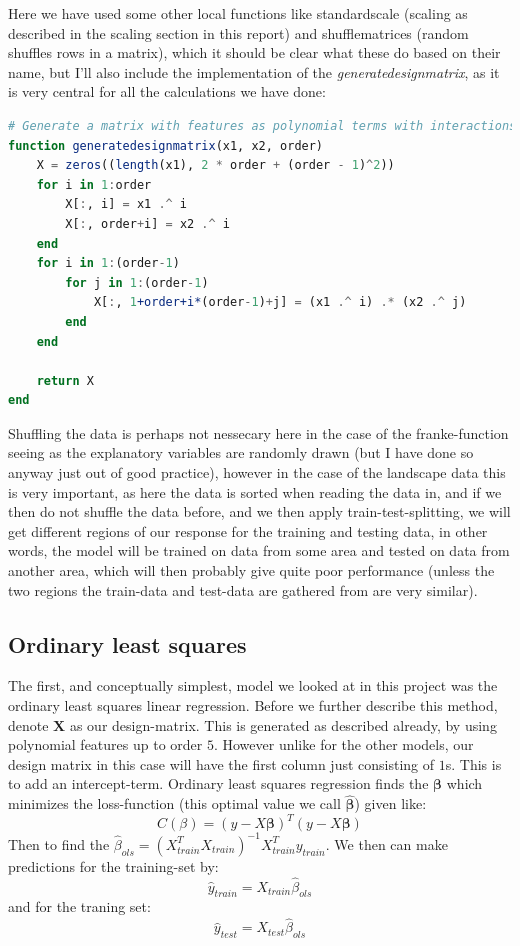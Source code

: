 \documentclass{article}
\begin{document}
Here we have used some other local functions like standardscale (scaling as
described in the scaling section in this report) and shufflematrices (random
shuffles rows in a matrix), which it should be clear what these do based on
their name, but I'll also include the implementation of the
\textit{generatedesignmatrix}, as it is very central for all the calculations we
have done:
\begin{lstlisting}[language=julia]
# Generate a matrix with features as polynomial terms with interactions
function generatedesignmatrix(x1, x2, order)
    X = zeros((length(x1), 2 * order + (order - 1)^2))
    for i in 1:order
        X[:, i] = x1 .^ i
        X[:, order+i] = x2 .^ i
    end
    for i in 1:(order-1)
        for j in 1:(order-1)
            X[:, 1+order+i*(order-1)+j] = (x1 .^ i) .* (x2 .^ j)
        end
    end

    return X
end
\end{lstlisting}

Shuffling the data is perhaps not nessecary here in the case of the
franke-function seeing as the explanatory variables are randomly drawn (but I
have done so anyway just out of good practice), however in the case of the
landscape data this is very important, as here the data is sorted when reading
the data in, and if we then do not shuffle the data before, and we then apply
train-test-splitting, we will get different regions of our response for the
training and testing data, in other words, the model will be trained on data
from some area and tested on data from another area, which will then probably
give quite poor performance (unless the two regions the train-data and test-data
are gathered from are very similar).


\subsection{Ordinary least squares}
The first, and conceptually simplest, model we looked at in this project was the
ordinary least squares linear regression. Before we further describe this
method, denote $\mathbf{X}$ as our design-matrix. This is generated as described
already, by using polynomial features up to order $5$. However unlike for the
other models, our design matrix in this case will have the first column just
consisting of $1$s. This is to add an intercept-term.  Ordinary least squares
regression finds the $\mathbf{\beta}$ which minimizes the loss-function (this
optimal value we call $\hat{\mathbf{\beta}}$) given like:
$$C(\beta) = (y - X\mathbf{\beta})^T (y - X\mathbf{\beta})$$
Then to find the $\hat{\beta}_{ols} = (X^T_{train} X_{train})^{-1} X^T_{train}
    y_{train}$. We then can make predictions for the training-set by:
$$\hat{y}_{train} = X_{train} \hat{\beta}_{ols}$$
and for the traning set:
$$\hat{y}_{test} = X_{test} \hat{\beta}_{ols}$$
\end{document}
